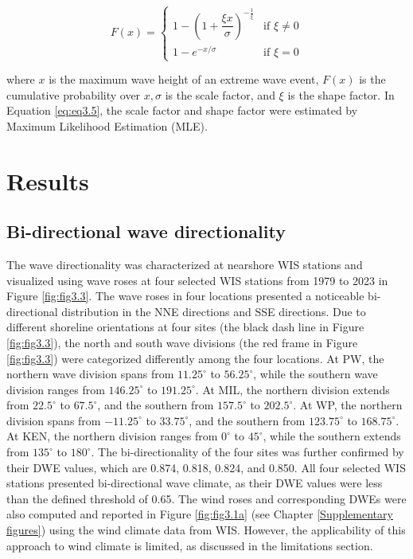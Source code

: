 \begin{equation}
    F(x) =
\begin{cases}
1 - \left(1 + \dfrac{\xi x}{\sigma} \right)^{-\frac{1}{\xi}} & \text{if } \xi \ne 0 \\
1 - e^{-x/\sigma} & \text{if } \xi = 0
\end{cases}
\label{eq:eq3.5}
\end{equation}

where $x$ is the maximum wave height of an extreme wave event, $F(x)$ is the cumulative probability over $x, \sigma$ is the scale factor, and $\xi$ is the shape factor. In Equation \ref{eq:eq3.5}, the scale factor and shape factor were estimated by Maximum Likelihood Estimation (MLE). 

\section{Results}
\label{c3_Results}

\subsection{Bi-directional wave directionality}
\label{c3_Bi-directional wave directionality}

The wave directionality was characterized at nearshore WIS stations and
visualized using wave roses at four selected WIS stations from 1979 to 2023 in
Figure \ref{fig:fig3.3}. The wave roses in four locations presented a noticeable
bi-directional distribution in the NNE directions and SSE directions. Due to
different shoreline orientations at four sites (the black dash line in Figure
\ref{fig:fig3.3}), the north and south wave divisions (the red frame in Figure
\ref{fig:fig3.3}) were categorized differently among the four locations. At PW,
the northern wave division spans from $11.25^\circ$ to $56.25^\circ$, while the
southern wave division ranges from $146.25^\circ$ to $191.25^\circ$. At MIL, the
northern division extends from $22.5^\circ$ to $67.5^\circ$, and the southern
from $157.5^\circ$ to $202.5^\circ$. At WP, the northern division spans from
$-11.25^\circ$ to $33.75^\circ$, and the southern from $123.75^\circ$ to
$168.75^\circ$. At KEN, the northern division ranges from $0^\circ$ to
$45^\circ$, while the southern extends from $135^\circ$ to $180^\circ$. The
bi-directionality of the four sites was further confirmed by their DWE values,
which are 0.874, 0.818, 0.824, and 0.850. All four selected WIS stations
presented bi-directional wave climate, as their DWE values were less than the
defined threshold of 0.65. The wind roses and corresponding DWEs were also
computed and reported in Figure \ref{fig:fig3.1a} (see Chapter
\ref{Supplementary figures}) using the wind climate data from WIS. However, the
applicability of this approach to wind climate is limited, as discussed in the
limitations section.

